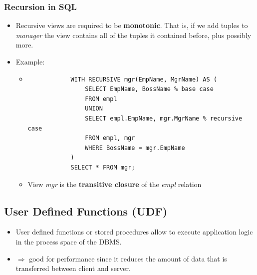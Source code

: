 \subsubsection{Recursion in SQL}
\begin{itemize}[label=\(\rhd\)]
    \item Recursive views are required to be \textbf{monotonic}. That is, if we add tuples to \textit{manager} the view contains all of the tuples it contained before, plus possibly more.
    \item Example:
    \begin{itemize}[label=\(\rhd\)]
        \item[] \begin{lstlisting}
            WITH RECURSIVE mgr(EmpName, MgrName) AS (
                SELECT EmpName, BossName % base case
                FROM empl
                UNION
                SELECT empl.EmpName, mgr.MgrName % recursive case
                FROM empl, mgr
                WHERE BossName = mgr.EmpName
            )
            SELECT * FROM mgr;
        \end{lstlisting}
        \item View \textit{mgr} is the \textbf{transitive closure} of the \textit{empl} relation
    \end{itemize}
\end{itemize}


\subsection{User Defined Functions (UDF)}
\begin{itemize}[label=\(\rhd\)]
    \item User defined functions or stored procedures allow to execute application logic in the process space of the DBMS.
    \item $\Rightarrow$ good for performance since it reduces the amount of data that is transferred between client and server.
\end{itemize}

